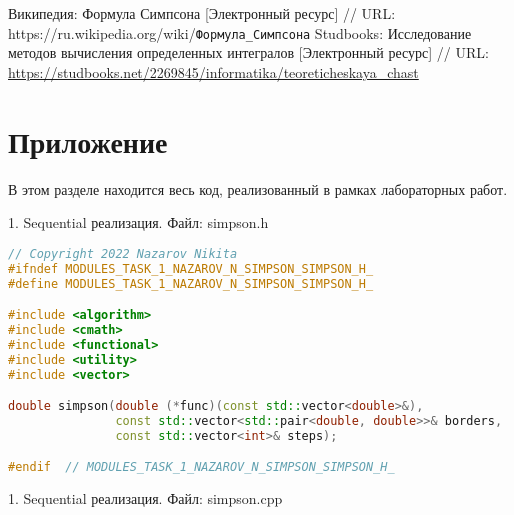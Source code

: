\documentclass{report}
\begin{document}
\begin{thebibliography}{1}
 Википедия: Формула Симпсона [Электронный ресурс] // URL: https://ru.wikipedia.org/wiki/\verb|Формула_Симпсона|
 Studbooks: Исследование методов вычисления определенных интегралов [Электронный ресурс] // URL: \url {https://studbooks.net/2269845/informatika/teoreticheskaya_chast}
\end{thebibliography}
\newpage

\section*{Приложение}
В этом разделе находится весь код, реализованный в рамках лабораторных работ.
\par 1. Sequential реализация. Файл: simpson.h
\begin{lstlisting}[language=C++]
// Copyright 2022 Nazarov Nikita
#ifndef MODULES_TASK_1_NAZAROV_N_SIMPSON_SIMPSON_H_
#define MODULES_TASK_1_NAZAROV_N_SIMPSON_SIMPSON_H_

#include <algorithm>
#include <cmath>
#include <functional>
#include <utility>
#include <vector>

double simpson(double (*func)(const std::vector<double>&),
               const std::vector<std::pair<double, double>>& borders,
               const std::vector<int>& steps);

#endif  // MODULES_TASK_1_NAZAROV_N_SIMPSON_SIMPSON_H_
\end{lstlisting}

\par 1. Sequential реализация. Файл: simpson.cpp
\end{document}
